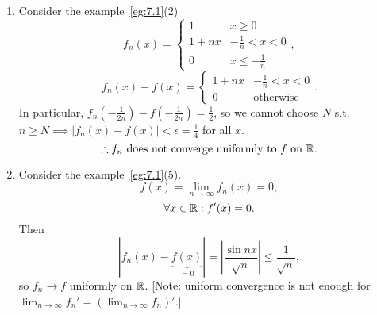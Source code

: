 \begin{example}
	\begin{enumerate}
		\item
		      Consider the example~\ref{eg:7.1}(2)
		      \[
			      f_n(x)=
			      \begin{cases}
				      1    & x\ge 0            \\
				      1+nx & -\frac{1}{n}<x<0  \\
				      0    & x\le -\frac{1}{n}
			      \end{cases}
			      ,\]
		      \[
			      f_n(x)-f(x)=	\begin{cases}
				      1+nx & -\frac{1}{n}<x<0 \\
				      0    & \text{otherwise}
			      \end{cases}
			      .\]
		      In particular, $f_n(-\frac{1}{2n})-f(-\frac{1}{2n})=\frac{1}{2}$, so we cannot choose $N$ s.t. $n\ge N\implies \left|f_n(x)-f(x)\right|<\epsilon=\frac{1}{4}$ for all $x$.
		      \[
			      \therefore f_n \text{ does not converge uniformly to } f \text{ on } \mathbb{R}
			      .\]
		\item
		      Consider the example~\ref{eg:7.1}(5).
		      \[
			      f(x)=\lim_{n\to \infty}{f_n(x)}=0
			      ,\]
		      \[
			      \forall{x \in \ensuremath{\mathbb{R}}}: f'(x)=0
			      .\]
		      Then \[
			      \left|f_n(x)-\underbrace{f(x)}_{=0}\right|=\left|\frac{\sin{nx}}{\sqrt{n}}\right|\le \frac{1}{\sqrt{n}}
			      ,\]
		      so $f_n\to f$ uniformly on $\mathbb{R}$.
			      [Note: uniform convergence is not enough for $\lim_{n\to \infty}{f_n'}=(\lim_{n\to \infty}{f_n})'$.]
	\end{enumerate}
\end{example}

